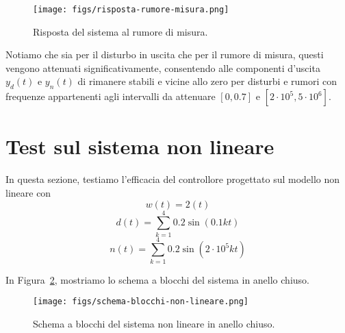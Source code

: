 \documentclass[a4paper, 11pt]{article}
\begin{document}
\begin{figure}[H]
    \centering
    \texttt{[image: figs/risposta-rumore-misura.png]}
    \caption{Risposta del sistema al rumore di misura.}
    \label{RispostaRumoreMisura}
\end{figure}

Notiamo che sia per il disturbo in uscita che per il rumore di misura, questi vengono attenuati significativamente, consentendo alle componenti d'uscita $y_d(t)$ e $y_n(t)$ di rimanere stabili e vicine allo zero per disturbi e rumori con frequenze appartenenti agli intervalli da attenuare $[0, 0.7]$ e $[2 \cdot 10^5, 5 \cdot 10^6]$.

\newpage
\section{Test sul sistema non lineare}

In questa sezione, testiamo l'efficacia del controllore progettato sul modello non lineare con
\[w(t) = 2(t) \]
\[d(t) = \sum^4_{k=1}0.2\sin(0.1kt)\] 
\[n(t) = \sum^4_{k=1}0.2\sin(2\cdot10^5kt)\]

In Figura~\ref{SchemaBlocchiNonLineare}, mostriamo lo schema a blocchi del sistema in anello chiuso.

\begin{figure}[H]
    \centering
    \texttt{[image: figs/schema-blocchi-non-lineare.png]}
    \caption{Schema a blocchi del sistema non lineare in anello chiuso.}
    \label{SchemaBlocchiNonLineare}
\end{figure}
\end{document}
